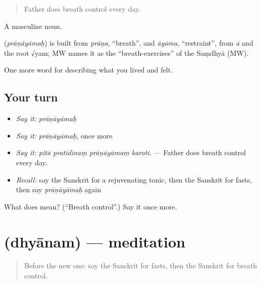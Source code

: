 \begin{quote}
Father does breath control every day.
\end{quote}

A masculine noun.

\begin{cousinweb}
\textbf{} (\emph{prāṇāyāmaḥ}) is built from \emph{prāṇa}, \textquotedblleft{}breath\textquotedblright{}, and \emph{āyāma}, \textquotedblleft{}restraint\textquotedblright{}, from \emph{ā} and the root √yam; MW names it as the \textquotedblleft{}breath-exercises\textquotedblright{} of the Saṃdhyā (MW).
\end{cousinweb}

\begin{grammarlens}[title={What you've built}]
One more word for describing what you lived and felt.
\end{grammarlens}

\subsection*{Your turn}
\begin{itemize}
\raggedright
  \item \emph{Say it:} \emph{prāṇāyāmaḥ}
  \item \emph{Say it:} \emph{prāṇāyāmaḥ}, once more
  \item \emph{Say it:} \emph{pitā pratidinaṃ prāṇāyāmaṃ karoti.} — Father does breath control every day.
  \item \emph{Recall:} say the Sanskrit for a rejuvenating tonic, then the Sanskrit for fasts, then say \emph{prāṇāyāmaḥ} again
\end{itemize}

\begin{tcolorbox}[breakable,colback=teal!4,colframe=teal!35!black,title={Before you move on}]
What does  mean? (\textquotedblleft{}Breath control\textquotedblright{}.) Say it once more.
\end{tcolorbox}
\section[\texorpdfstring{\sk{ध्यानम्} (dhyānam)}{ध्यानम् (dhyānam)}]{ (dhyānam) — meditation}

\label{lesson:SA-C486-dhyanam}



\begin{quote}
Before the new one: say the Sanskrit for fasts, then the Sanskrit for breath control.
\end{quote}

